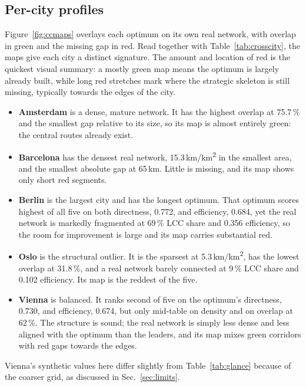 \documentclass[11pt,a4paper]{article}
\begin{document}
\subsection{Per-city profiles}

Figure~\ref{fig:ccmaps} overlays each optimum on its own real network, with overlap in
green and the missing gap in red. Read together with Table~\ref{tab:crosscity}, the maps
give each city a distinct signature. The amount and location of red is the quickest visual
summary: a mostly green map means the optimum is largely already built, while long red
stretches mark where the strategic skeleton is still missing, typically towards the edges
of the city.
\begin{itemize}\setlength{\itemsep}{2pt}
\item \textbf{Amsterdam} is a dense, mature network. It has the highest overlap at 75.7\,\%
      and the smallest gap relative to its size, so its map is almost entirely green: the
      central routes already exist.
\item \textbf{Barcelona} has the densest real network, 15.3\,km/km\textsuperscript{2} in the
      smallest area, and the smallest absolute gap at 65\,km. Little is missing, and its map
      shows only short red segments.
\item \textbf{Berlin} is the largest city and has the longest optimum. That optimum scores
      highest of all five on both directness, 0.772, and efficiency, 0.684, yet the real
      network is markedly fragmented at 69\,\% LCC share and 0.356 efficiency, so the room
      for improvement is large and its map carries substantial red.
\item \textbf{Oslo} is the structural outlier. It is the sparsest at
      5.3\,km/km\textsuperscript{2}, has the lowest overlap at 31.8\,\%, and a real network
      barely connected at 9\,\% LCC share and 0.102 efficiency. Its map is the reddest of
      the five.
\item \textbf{Vienna} is balanced. It ranks second of five on the optimum's directness,
      0.730, and efficiency, 0.674, but only mid-table on density and on overlap at 62\,\%.
      The structure is sound; the real network is simply less dense and less aligned with
      the optimum than the leaders, and its map mixes green corridors with red gaps towards
      the edges.
\end{itemize}
Vienna's synthetic values here differ slightly from Table~\ref{tab:glance} because of the
coarser grid, as discussed in Sec.~\ref{sec:limits}.
\end{document}
